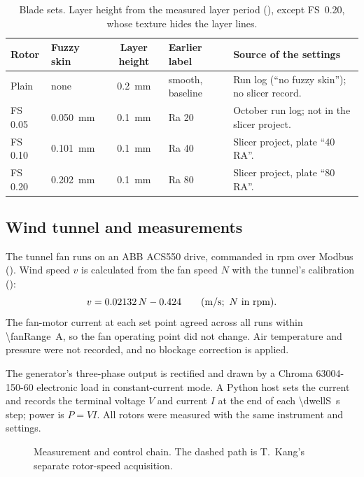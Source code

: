 \documentclass[11pt]{article}
\begin{document}
\begin{table}[h]
\centering\small
\caption{Blade sets. Layer height from the measured layer period (), except
FS~0.20, whose texture hides the layer lines.}\label{tab:specimens}
\begin{tabularx}{\linewidth}{@{}l l c l >{\raggedright\arraybackslash}X@{}}
\toprule
Rotor & Fuzzy skin & Layer height & Earlier label & Source of the settings \\
\midrule
Plain   & none           & \SI{0.2}{mm} & smooth, baseline & Run log (``no fuzzy skin''); no slicer record. \\
FS 0.05 & \SI{0.050}{mm} & \SI{0.1}{mm} & Ra 20 & 1 October run log; not in the slicer project. \\
FS 0.10 & \SI{0.101}{mm} & \SI{0.1}{mm} & Ra 40 & Slicer project, plate ``40 RA''. \\
FS 0.20 & \SI{0.202}{mm} & \SI{0.1}{mm} & Ra 80 & Slicer project, plate ``80 RA''. \\
\bottomrule
\end{tabularx}
\end{table}

\subsection{Wind tunnel and measurements}\label{sec:wind}
The tunnel fan runs on an ABB ACS550 drive, commanded in rpm over Modbus (). Wind
speed $v$ is calculated from the fan speed $N$ with the tunnel's calibration ():
\[ v = \calA\,N - \calB \qquad (\si{m/s};\ N \text{ in rpm}). \]
The fan-motor current at each set point agreed across all runs within \SI{\fanRange}{A}, so the fan
operating point did not change. Air temperature and pressure were not recorded, and no blockage
correction is applied.

The generator's three-phase output is rectified and drawn by a Chroma 63004-150-60 electronic load
in constant-current mode. A Python host sets the current and records the terminal voltage $V$ and
current $I$ at the end of each \SI{\dwellS}{s} step; power is $P=VI$. All rotors were measured with
the same instrument and settings.

\begin{figure}[h]
  \centering
  
  \caption{Measurement and control chain. The dashed path is T.~Kang's separate rotor-speed
  acquisition.}
  \label{fig:rig}
\end{figure}
\end{document}
